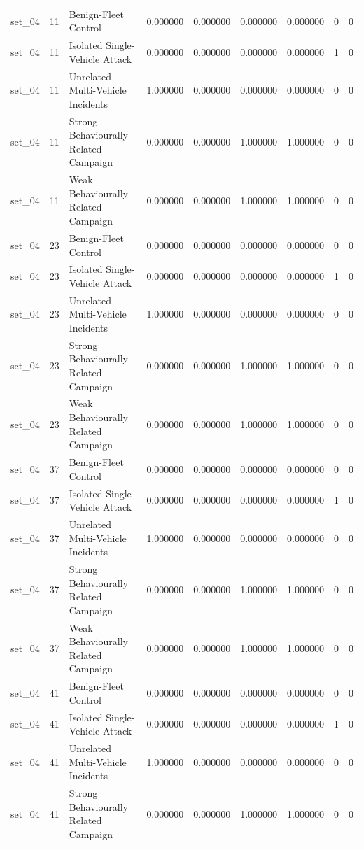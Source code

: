 \begin{tabular}{lrlrrrrrr}
set_04 & 11 & Benign-Fleet Control & 0.000000 & 0.000000 & 0.000000 & 0.000000 & 0 & 0 \\
set_04 & 11 & Isolated Single-Vehicle Attack & 0.000000 & 0.000000 & 0.000000 & 0.000000 & 1 & 0 \\
set_04 & 11 & Unrelated Multi-Vehicle Incidents & 1.000000 & 0.000000 & 0.000000 & 0.000000 & 0 & 0 \\
set_04 & 11 & Strong Behaviourally Related Campaign & 0.000000 & 0.000000 & 1.000000 & 1.000000 & 0 & 0 \\
set_04 & 11 & Weak Behaviourally Related Campaign & 0.000000 & 0.000000 & 1.000000 & 1.000000 & 0 & 0 \\
set_04 & 23 & Benign-Fleet Control & 0.000000 & 0.000000 & 0.000000 & 0.000000 & 0 & 0 \\
set_04 & 23 & Isolated Single-Vehicle Attack & 0.000000 & 0.000000 & 0.000000 & 0.000000 & 1 & 0 \\
set_04 & 23 & Unrelated Multi-Vehicle Incidents & 1.000000 & 0.000000 & 0.000000 & 0.000000 & 0 & 0 \\
set_04 & 23 & Strong Behaviourally Related Campaign & 0.000000 & 0.000000 & 1.000000 & 1.000000 & 0 & 0 \\
set_04 & 23 & Weak Behaviourally Related Campaign & 0.000000 & 0.000000 & 1.000000 & 1.000000 & 0 & 0 \\
set_04 & 37 & Benign-Fleet Control & 0.000000 & 0.000000 & 0.000000 & 0.000000 & 0 & 0 \\
set_04 & 37 & Isolated Single-Vehicle Attack & 0.000000 & 0.000000 & 0.000000 & 0.000000 & 1 & 0 \\
set_04 & 37 & Unrelated Multi-Vehicle Incidents & 1.000000 & 0.000000 & 0.000000 & 0.000000 & 0 & 0 \\
set_04 & 37 & Strong Behaviourally Related Campaign & 0.000000 & 0.000000 & 1.000000 & 1.000000 & 0 & 0 \\
set_04 & 37 & Weak Behaviourally Related Campaign & 0.000000 & 0.000000 & 1.000000 & 1.000000 & 0 & 0 \\
set_04 & 41 & Benign-Fleet Control & 0.000000 & 0.000000 & 0.000000 & 0.000000 & 0 & 0 \\
set_04 & 41 & Isolated Single-Vehicle Attack & 0.000000 & 0.000000 & 0.000000 & 0.000000 & 1 & 0 \\
set_04 & 41 & Unrelated Multi-Vehicle Incidents & 1.000000 & 0.000000 & 0.000000 & 0.000000 & 0 & 0 \\
set_04 & 41 & Strong Behaviourally Related Campaign & 0.000000 & 0.000000 & 1.000000 & 1.000000 & 0 & 0 \\

\end{tabular}
